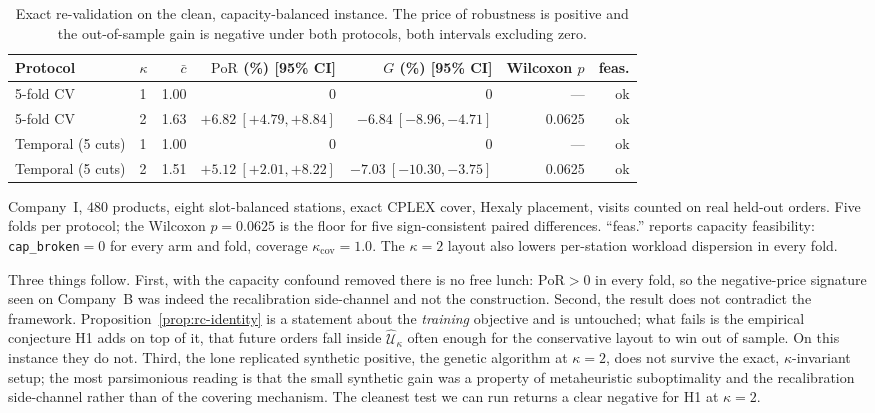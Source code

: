 \documentclass[preprint,review,11pt,authoryear]{elsarticle}
\begin{document}
\begin{table}[t]
  \centering
  \small
  \begin{threeparttable}
  \begin{tabular}{@{}llrrrrr@{}}
    \toprule
    Protocol & $\kappa$ & $\bar c$ & $\mathrm{PoR}$ (\%) [95\% CI] & $G$ (\%) [95\% CI] & Wilcoxon $p$ & feas. \\
    \midrule
    5-fold CV       & 1 & 1.00 & $0$ & $0$ & --- & ok \\
    5-fold CV       & 2 & 1.63 & $+6.82\ [+4.79,+8.84]$ & $-6.84\ [-8.96,-4.71]$ & 0.0625 & ok \\
    Temporal (5 cuts) & 1 & 1.00 & $0$ & $0$ & --- & ok \\
    Temporal (5 cuts) & 2 & 1.51 & $+5.12\ [+2.01,+8.22]$ & $-7.03\ [-10.30,-3.75]$ & 0.0625 & ok \\
    \bottomrule
  \end{tabular}
  \begin{tablenotes}\footnotesize
    \item Company~I, $480$ products, eight slot-balanced stations, exact CPLEX cover, Hexaly placement, visits counted on real held-out orders. Five folds per protocol; the Wilcoxon $p=0.0625$ is the floor for five sign-consistent paired differences. ``feas.'' reports capacity feasibility: \texttt{cap\_broken}$=0$ for every arm and fold, coverage $\kappa_{\text{cov}}=1.0$. The $\kappa=2$ layout also lowers per-station workload dispersion in every fold.
  \end{tablenotes}
  \end{threeparttable}
  \caption{Exact re-validation on the clean, capacity-balanced instance. The price of robustness is positive and the out-of-sample gain is negative under both protocols, both intervals excluding zero.}
  \label{tab:rc-iscf}
\end{table}

Three things follow. First, with the capacity confound removed there is no free lunch: $\mathrm{PoR}>0$ in every fold, so the negative-price signature seen on Company~B was indeed the recalibration side-channel and not the construction. Second, the result does not contradict the framework. Proposition~\ref{prop:rc-identity} is a statement about the \emph{training} objective and is untouched; what fails is the empirical conjecture H1 adds on top of it, that future orders fall inside $\widehat{\mathcal U}_\kappa$ often enough for the conservative layout to win out of sample. On this instance they do not. Third, the lone replicated synthetic positive, the genetic algorithm at $\kappa=2$, does not survive the exact, $\kappa$-invariant setup; the most parsimonious reading is that the small synthetic gain was a property of metaheuristic suboptimality and the recalibration side-channel rather than of the covering mechanism. The cleanest test we can run returns a clear negative for H1 at $\kappa=2$.
\end{document}
